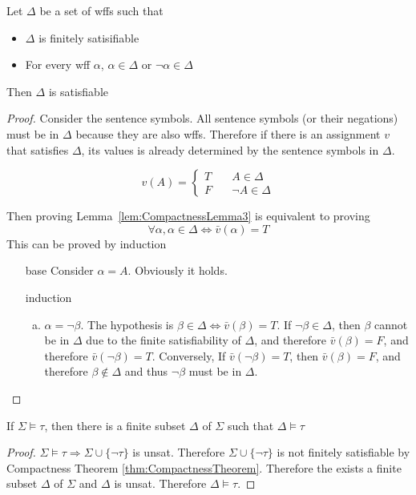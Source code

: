 \begin{lemma}
    \label{lem:CompactnessLemma3}
    Let $\Delta$ be a set of wffs such that
    \begin{itemize}
        \item $\Delta$ is finitely satisifiable
        \item For every wff $\alpha$, $\alpha\in\Delta$ or $\neg\alpha\in\Delta$
    \end{itemize}
    Then $\Delta$ is satisfiable
\end{lemma}
\begin{proof}
    Consider the sentence symbols. All sentence symbols (or their negations) must be in $\Delta$ because they are also wffs. Therefore if there is an assignment $v$ that satisfies $\Delta$, its values is already determined by the sentence symbols in $\Delta$.

    \[v(A)=\begin{cases}
        T &\quad A\in\Delta\\
        F &\quad \neg A\in\Delta
    \end{cases}\]

    Then proving Lemma~\ref{lem:CompactnessLemma3} is equivalent to proving
    \[ \forall \alpha, \alpha\in\Delta\Leftrightarrow\bar{v}(\alpha) = T \]
    This can be proved by induction
    \begin{itemize}
        \item[base] Consider $\alpha=A$. Obviously it holds.
        \item[induction] \begin{enumerate}[(a)]
            \item $\alpha=\neg\beta$. The hypothesis is $\beta\in\Delta \Leftrightarrow \bar{v}(\beta)=T$. If $\neg\beta\in\Delta$, then $\beta$ cannot be in $\Delta$ due to the finite satisfiability of $\Delta$, and therefore $\bar{v}(\beta) = F$, and therefore $\bar{v}(\neg\beta) = T$. Conversely, If $\bar{v}(\neg\beta) = T$, then $\bar{v}(\beta) =F$, and therefore $\beta\notin\Delta$ and thus $\neg\beta$ must be in $\Delta$.
        \end{enumerate}
    \end{itemize}
\end{proof}

\begin{corollary}
    \label{coroll:CorollaryOfTheCompactnessTheorem}
    If $\Sigma\vDash\tau$, then there is a finite subset $\Delta$ of $\Sigma$ such that $\Delta\vDash\tau$
\end{corollary}
\begin{proof}
    $\Sigma\vDash\tau\Rightarrow\Sigma\cup\{\neg\tau\}$ is unsat. Therefore $\Sigma\cup\{\neg\tau\}$ is not finitely satisfiable by Compactness Theorem \ref{thm:CompactnessTheorem}. Therefore the exists a finite subset $\Delta$ of $\Sigma$ and $\Delta$ is unsat. Therefore $\Delta\vDash\tau$.
\end{proof}